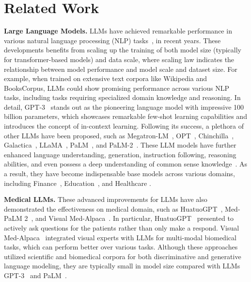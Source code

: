 \documentclass{article} %
\begin{document}
\section{Related Work}
\label{related_work}
\textbf{Large Language Models.} LLMs have achieved remarkable performance in various natural language processing (NLP) tasks~\citep{brown2020language,wei2022chain,liu2023thinkinmemory}, in recent years. These developments benefits from scaling up the training of both model size (typically for transformer-based models) and data scale, where scaling law \cite{chung2022scaling} indicates the relationship between model performance and model scale and dataset size. For example, when trained on extensive text corpora like Wikipedia and BooksCorpus, LLMs could show promising performance across various NLP tasks, including tasks requiring specialized domain knowledge and reasoning. In detail, GPT-3~\citep{brown2020language} stands out as the pioneering language model with impressive 100 billion parameters, which showcases remarkable few-shot learning capabilities and introduces the concept of in-context learning. Following its success, a plethora of other LLMs have been proposed, such as Megatron-LM~\citep{korthikanti2023reducing}, OPT~\citep{zhang2022opt}, Chinchilla~\citep{hoffmann2022training}, Galactica~\citep{taylor2022galactica}, LLaMA~\citep{touvron2302llama}, PaLM~\citep{chowdhery2022palm}, and PaLM-2~\citep{singhal2023expertlevel}. These LLM models have further enhanced language understanding, generation, instruction following, reasoning abilities, and even possess a deep understanding of common sense knowledge~\citep{mao2023gpteval}. As a result, they have become indispensable base models across various domains, including Finance~\citep{yang2023fingpt}, Education~\citep{milano2023large}, and Healthcare \cite{arora2023promise}.

\textbf{Medical LLMs.} These advanced improvements for LLMs have also demonstrated the effectiveness on medical domain, such as HuatuoGPT~\citep{zhang2023huatuogpt}, Med-PaLM 2~\citep{singhal2023expertlevel}, and Visual Med-Alpaca~\citep{gao2023ophglm}. In particular, HuatuoGPT~\citep{zhang2023huatuogpt} presented to actively ask questions for the patients rather than only make a respond. Visual Med-Alpaca~\citep{gao2023ophglm} integrated visual experts with LLMs for multi-modal biomedical tasks, which can perform better over various tasks. Although these approaches utilized scientific and biomedical corpora for both discriminative and generative language modeling, they are typically small in model size compared with LLMs GPT-3~\citep{brown2020language} and PaLM~\citep{chowdhery2022palm}. 
\end{document}
